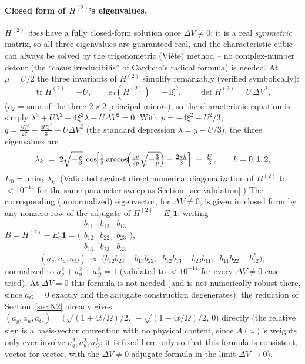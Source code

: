 \documentclass[11pt]{article}
\begin{document}
\paragraph{Closed form of $H^{(2)}$'s eigenvalues.} $H^{(2)}$ \emph{does} have a fully
closed-form solution once $\Delta V\neq0$: it is a real \emph{symmetric} matrix, so all
three eigenvalues are guaranteed real, and the characteristic cubic can always be solved
by the trigonometric (Vi\`ete) method -- no complex-number detour (the ``casus
irreducibilis'' of Cardano's radical formula) is needed. At $\mu=U/2$ the three invariants
of $H^{(2)}$ simplify remarkably (verified symbolically):
\begin{equation}
  \operatorname{tr}H^{(2)} = -U,\qquad
  e_2(H^{(2)}) = -4\xi^2,\qquad
  \det H^{(2)} = U\,\Delta V^2,
  \label{eq:invariants}
\end{equation}
($e_2$ = sum of the three $2\times2$ principal minors), so the characteristic equation is
simply $\lambda^3+U\lambda^2-4\xi^2\lambda-U\Delta V^2=0$. With
$p=-4\xi^2-U^2/3$, $q=\tfrac{2U^3}{27}+\tfrac{4U\xi^2}{3}-U\Delta V^2$ (the standard
depression $\lambda=y-U/3$), the three eigenvalues are
\begin{equation}
  \lambda_k \;=\; 2\sqrt{-\tfrac{p}{3}}\,\cos\!\Bigl[\tfrac13\arccos\!\Bigl(\tfrac{3q}{2p}\sqrt{-\tfrac3p}\Bigr)-\tfrac{2\pi k}{3}\Bigr]\;-\;\tfrac U3,
  \qquad k=0,1,2,
  \label{eq:cubic}
\end{equation}
$E_0=\min_k\lambda_k$. (Validated against direct numerical diagonalization of $H^{(2)}$ to
$<10^{-14}$ for the same parameter sweep as Section~\ref{sec:validation}.) The
corresponding (unnormalized) eigenvector, for $\Delta V\neq0$, is given in closed form by
any nonzero row of the adjugate of $H^{(2)}-E_0\mathbf 1$: writing
$B=H^{(2)}-E_0\mathbf 1=\bigl(\begin{smallmatrix}b_{11}&b_{12}&b_{13}\\b_{12}&b_{22}&b_{23}\\b_{13}&b_{23}&b_{33}\end{smallmatrix}\bigr)$,
\begin{equation}
  (a_g,a_u,a_O)\;\propto\;\bigl(b_{12}b_{23}-b_{13}b_{22},\;\;b_{12}b_{13}-b_{23}b_{11},\;\;b_{11}b_{22}-b_{12}^2\bigr),
  \label{eq:eigvec}
\end{equation}
normalized to $a_g^2+a_u^2+a_O^2=1$ (validated to $<10^{-14}$ for every $\Delta V\neq0$
case tried). At $\Delta V=0$ this formula is not needed (and is not numerically robust
there, since $a_O=0$ exactly and the adjugate construction degenerates): the reduction of
Section~\ref{sec:N2} already gives $(a_g,a_u,a_O)=\bigl(\sqrt{(1+4t/\Omega)/2},\,
-\sqrt{(1-4t/\Omega)/2},\,0\bigr)$ directly (the relative sign is a basis-vector convention
with no physical content, since $A(\omega)$'s weights only ever involve $a_g^2,a_u^2,a_O^2$;
it is fixed here only so that this formula is consistent, vector-for-vector, with the
$\Delta V\neq0$ adjugate formula in the limit $\Delta V\to0$).
\end{document}
